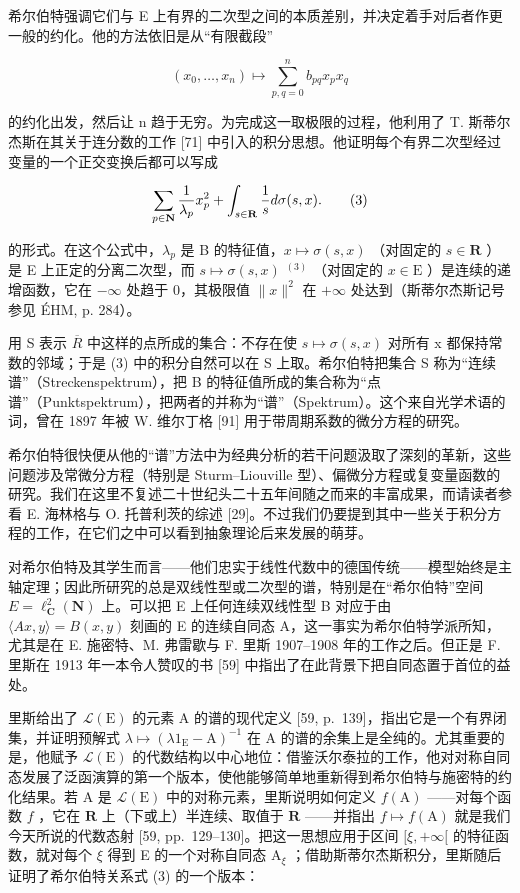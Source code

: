 希尔伯特强调它们与 E 上有界的二次型之间的本质差别，并决定着手对后者作更一般的约化。他的方法依旧是从“有限截段”

\[
(x _ {0}, \ldots , x _ {n}) \mapsto \sum_ {p, q = 0} ^ {n} b _ {p q} x _ {p} x _ {q}
\]

的约化出发，然后让 n 趋于无穷。为完成这一取极限的过程，他利用了 T. 斯蒂尔杰斯在其关于连分数的工作 [71] 中引入的积分思想。他证明每个有界二次型经过变量的一个正交变换后都可以写成

\[
\sum_ {p \in {\bf N}} \frac {1}{\lambda_ {p}} x _ {p} ^ {2} + \int_ {s \in {\bf R}} \frac {1}{s} d \sigma (s, x).\tag{3}
\]

的形式。在这个公式中，\(\lambda_{p}\) 是 B 的特征值，\(x\mapsto\sigma(s,x)\) （对固定的 \(s\in\mathbf{R}\) ）是 E 上正定的分离二次型，而 \(s\mapsto\sigma(s,x)\) \(^{(3)}\) （对固定的 \(x\in\mathrm{E}\) ）是连续的递增函数，它在 \(-\infty\) 处趋于 0，其极限值 \(\|x\|^2\) 在 \(+\infty\) 处达到（斯蒂尔杰斯记号参见 ÉHM, p. 284）。

用 S 表示 \(\overline{R}\) 中这样的点所成的集合：不存在使 \(s \mapsto \sigma(s, x)\) 对所有 x 都保持常数的邻域；于是 (3) 中的积分自然可以在 S 上取。希尔伯特把集合 S 称为“连续谱”（Streckenspektrum），把 B 的特征值所成的集合称为“点谱”（Punktspektrum），把两者的并称为“谱”（Spektrum）。这个来自光学术语的词，曾在 1897 年被 W. 维尔丁格 [91] 用于带周期系数的微分方程的研究。

希尔伯特很快便从他的“谱”方法中为经典分析的若干问题汲取了深刻的革新，这些问题涉及常微分方程（特别是 Sturm–Liouville 型）、偏微分方程或复变量函数的研究。我们在这里不复述二十世纪头二十五年间随之而来的丰富成果，而请读者参看 E. 海林格与 O. 托普利茨的综述 [29]。不过我们仍要提到其中一些关于积分方程的工作，在它们之中可以看到抽象理论后来发展的萌芽。

对希尔伯特及其学生而言——他们忠实于线性代数中的德国传统——模型始终是主轴定理；因此所研究的总是双线性型或二次型的谱，特别是在“希尔伯特”空间 \(E = \ell_{\mathbf{C}}^{2}(\mathbf{N})\) 上。可以把 E 上任何连续双线性型 B 对应于由 \(\langle Ax, y \rangle = B(x, y)\) 刻画的 E 的连续自同态 A，这一事实为希尔伯特学派所知，尤其是在 E. 施密特、M. 弗雷歇与 F. 里斯 1907–1908 年的工作之后。但正是 F. 里斯在 1913 年一本令人赞叹的书 [59] 中指出了在此背景下把自同态置于首位的益处。

里斯给出了 \(\mathcal{L}(\mathrm{E})\) 的元素 A 的谱的现代定义 [59, p.~139]，指出它是一个有界闭集，并证明预解式 \(\lambda \mapsto (\lambda 1_{\mathrm{E}} - \mathrm{A})^{-1}\) 在 A 的谱的余集上是全纯的。尤其重要的是，他赋予 \(\mathcal{L}(\mathrm{E})\) 的代数结构以中心地位：借鉴沃尔泰拉的工作，他对对称自同态发展了泛函演算的第一个版本，使他能够简单地重新得到希尔伯特与施密特的约化结果。若 A 是 \(\mathcal{L}(\mathrm{E})\) 中的对称元素，里斯说明如何定义 \(f(\mathrm{A})\) ——对每个函数 \(f\) ，它在 \(\mathbf{R}\) 上（下或上）半连续、取值于 \(\mathbf{R}\) ——并指出 \(f \mapsto f(\mathrm{A})\) 就是我们今天所说的代数态射 [59, pp.~129--130]。把这一思想应用于区间 \([\xi, +\infty[\) 的特征函数，就对每个 \(\xi\) 得到 E 的一个对称自同态 \(\mathrm{A}_{\xi}\) ；借助斯蒂尔杰斯积分，里斯随后证明了希尔伯特关系式 (3) 的一个版本：

